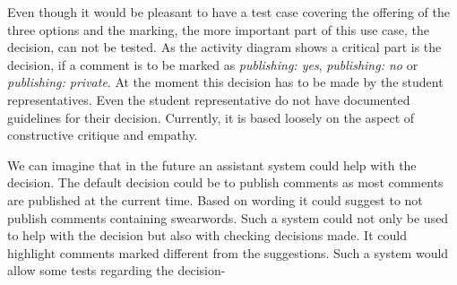 Even though it would be pleasant to have a test case covering the offering of the three options and the marking, the more important part of this use case, the decision, can not be tested.
As the activity diagram shows a critical part is the decision, if a comment is to be marked as \emph{publishing: yes}, \emph{publishing: no} or \emph{publishing: private}.
At the moment this decision has to be made by the student representatives.
Even the student representative do not have documented guidelines for their decision.
Currently, it is based loosely on the aspect of constructive critique and empathy.

We can imagine that in the future an assistant system could help with the decision.
The default decision could be to publish comments as most comments are published at the current time.
Based on wording it could suggest to not publish comments containing swearwords.
Such a system could not only be used to help with the decision but also with checking decisions made.
It could highlight comments marked different from the suggestions.
Such a system would allow some tests regarding the decision-
